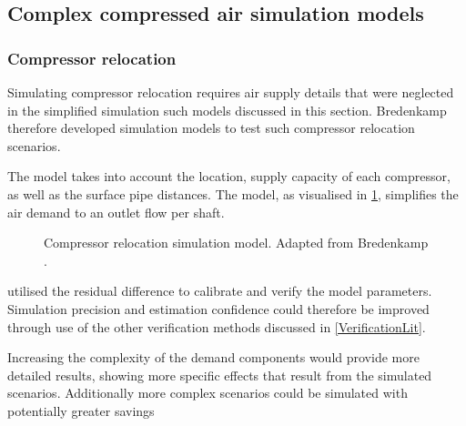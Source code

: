\subsection{Complex compressed air simulation models} \label{simplfiedModels}
\subsubsection{Compressor relocation}
Simulating compressor relocation requires air supply details that were neglected in the simplified simulation such models discussed in this section. Bredenkamp \cite{Bredenkamp2013Masters} therefore developed simulation models to test such compressor relocation scenarios. 
\par
The model takes into account the location, supply capacity of each compressor, as well as the surface pipe distances. The model, as visualised in \cref{fig: bredenkamp  model}, simplifies the air demand to an outlet flow per shaft.
\par
\begin{figure}[h!]
	\centering
	\caption[Compressor relocation simulation model.]{Compressor relocation simulation model. Adapted from Bredenkamp \cite{Bredenkamp2013Masters}.}
	\label{fig: bredenkamp  model}
\end{figure} 
\cite{Bredenkamp2013Masters} utilised the residual difference to calibrate and verify the model parameters. Simulation precision and estimation confidence could therefore be improved through use of the other verification methods discussed in \cref{VerificationLit}.
\par 
Increasing the complexity of the demand components would provide more detailed results, showing more specific effects that result from the simulated scenarios.  Additionally more complex scenarios could be simulated with potentially greater savings

